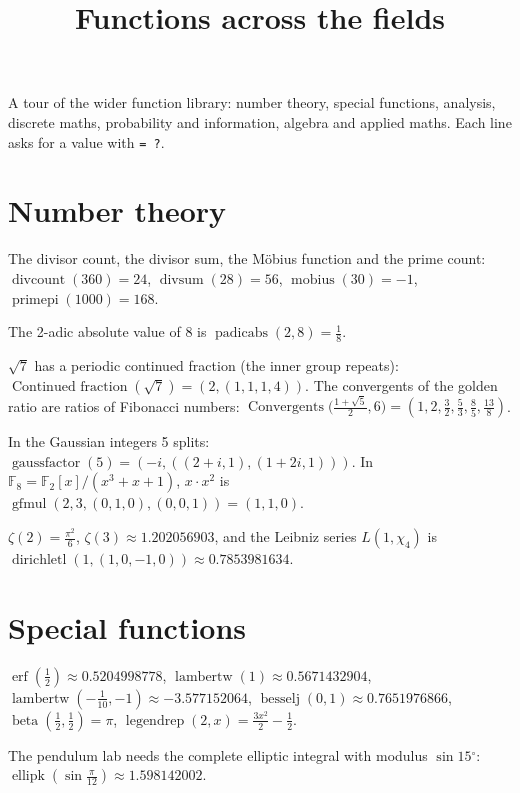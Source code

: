 \documentclass[11pt,a4paper]{article}
\title{Functions across the fields}
\date{}
\providecommand{\degree}{\ensuremath{^\circ}}
\theoremstyle{plain}
\theoremstyle{definition}
\theoremstyle{remark}
\begin{document}
\maketitle
A tour of the wider function library: number theory, special functions, analysis, discrete maths, probability and information, algebra and applied maths. Each line asks for a value with \texttt{= ?}.

\section*{Number theory}

The divisor count, the divisor sum, the M\"{o}bius function and the prime count:
$\operatorname{divcount}(360) = 24$, $\operatorname{divsum}(28) = 56$, $\operatorname{mobius}(30) = -1$, $\operatorname{primepi}(1000) = 168$.

The 2-adic absolute value of 8 is $\operatorname{padicabs}(2, 8) = \frac{1}{8}$.

$\sqrt 7$ has a periodic continued fraction (the inner group repeats): $\operatorname{Continued\ fraction}(\sqrt 7) = \left(2, \left(1, 1, 1, 4\right)\right)$. The convergents of the golden ratio are ratios of Fibonacci numbers:
$\operatorname{Convergents}\big(\tfrac{1 + \sqrt 5}{2}, 6\big) = \left(1, 2, \frac{3}{2}, \frac{5}{3}, \frac{8}{5}, \frac{13}{8}\right)$.

In the Gaussian integers 5 splits: $\operatorname{gaussfactor}(5) = \left(-i, \left(\left(2 + i, 1\right), \left(1 + 2 i, 1\right)\right)\right)$. In $\mathbb F_8 = \mathbb F_2[x]/(x^3 + x + 1)$, $x \cdot x^2$ is $\operatorname{gfmul}(2, 3, (0, 1, 0), (0, 0, 1)) = \left(1, 1, 0\right)$.

$\zeta(2) = \frac{\pi^{2}}{6}$, $\zeta(3) \approx 1.202056903$, and the Leibniz series $L(1, \chi_4)$ is $\operatorname{dirichletl}(1, (1, 0, -1, 0)) \approx 0.7853981634$.

\section*{Special functions}

$\operatorname{erf}(\tfrac12) \approx 0.5204998778$, $\operatorname{lambertw}(1) \approx 0.5671432904$, $\operatorname{lambertw}(-\tfrac1{10}, -1) \approx -3.577152064$, $\operatorname{besselj}(0, 1) \approx 0.7651976866$, $\operatorname{beta}(\tfrac12, \tfrac12) = \pi$, $\operatorname{legendrep}(2, x) = \frac{3 x^{2}}{2} - \frac{1}{2}$.

The pendulum lab needs the complete elliptic integral with modulus $\sin 15\degree $: $\operatorname{ellipk}(\sin\tfrac{\pi}{12}) \approx 1.598142002$.
\end{document}
